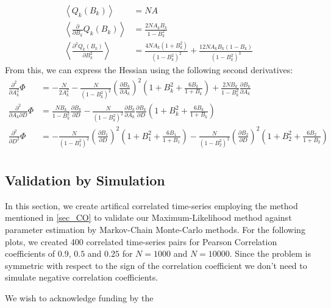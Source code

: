 \documentclass[%
 reprint,
 amsmath,amssymb,
 aps,
]{revtex4-1}
\begin{document}
\begin{equation}
	\begin{aligned}
	\left\langle Q_{k}(B_{k})\right\rangle &= NA\\
	\left\langle\frac{\partial}{\partial B_{k}}Q_{k}(B_{k})\right\rangle &=  \frac{2NA_{k}B_{k}}{1-B_{k}^{2}}\\
	\left\langle\frac{\partial^{2}Q_{k}(B_{k})}{\partial B_{k}^{2}}\right\rangle &= \frac{4NA_{k}(1+B_{k}^{2})}{(1-B_{k}^{2})^{2}}
	+\frac{12NA_{k}B_{k}(1-B_{k})}{(1-B_{k}^{2})^{3}}
	\end{aligned}
\end{equation}
From this, we can express the Hessian using the following second derivatives:
\begin{equation}
	\begin{aligned}
		\frac{\partial^{2}}{\partial A_{k}^2}\Phi &= -\frac{N}{2A_{k}^{2}} 
		- \frac{N}{(1-B_{k}^{2})^{2}}\left(\frac{\partial B_{k}}{\partial A_{k}}\right)^{2}
		\left(1+B_{k}^{2}+\frac{6B_{k}}{1+B_{k}}\right)+\frac{2NB_{k}}{1-B_{k}^{2}}\frac{\partial B_{k}}{\partial A_{k}}\\
		\frac{\partial^{2}}{\partial A_{k}\partial D}\Phi &=
		\frac{NB_{k}}{1-B_{k}^{2}}\frac{\partial B_{k}}{\partial D}
		-\frac{N}{(1-B_{k}^{2})^{2}}\frac{\partial B_{k}}{\partial A_{k}}\frac{\partial B_{k}}{\partial D}
		\left(1+B_{k}^{2}+\frac{6B_{k}}{1+B_{k}}\right)\\
		\frac{\partial^{2}}{\partial D^2}\Phi &=
		- \frac{N}{(1-B_{1}^{2})^{2}}\left(\frac{\partial B_{1}}{\partial D}\right)^{2}
		\left(1+B_{1}^{2}+\frac{6B_{1}}{1+B_{1}}\right)
		- \frac{N}{(1-B_{2}^{2})^{2}}\left(\frac{\partial B_{2}}{\partial D}\right)^{2}
		\left(1+B_{2}^{2}+\frac{6B_{2}}{1+B_{2}}\right)\\
	\end{aligned}
\end{equation}
\subsection{Validation by Simulation}
In this section, we create artifical correlated time-series employing the method mentioned in \ref{sec_CO} to validate our Maximum-Likelihood method against parameter estimation by Markov-Chain Monte-Carlo methods.  For the following plots, we created 400 correlated time-series pairs for Pearson Correlation coefficients of $0.9$, $0.5$ and $0.25$ for $N=1000$ and $N=10000$.  Since the problem is symmetric with respect to the sign of the correlation coefficient we don't need to simulate negative correlation coefficients.

\begin{acknowledgments}
We wish to acknowledge funding by the 
\end{acknowledgments}

\end{document}
